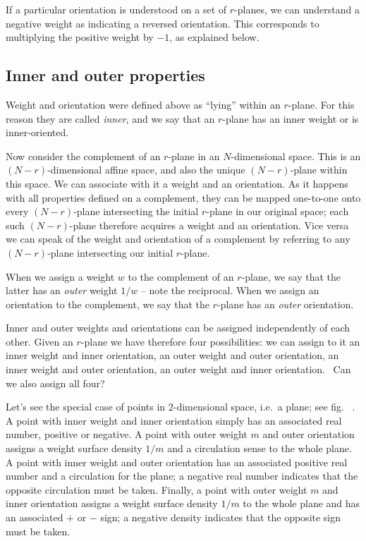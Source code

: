 \documentclass[\ifafour a4paper,12pt,\else a5paper,10pt,\fi%
onecolumn,oneside,article,%
british%
]{memoir}
\theoremstyle{remark}
\theoremstyle{innote}
\renewcommand*{\|}{\nonscript\,\vert\nonscript\;\mathopen{}}
\newcommand*{\fig}{fig.}%
\newcommand*{\ie}{{i.e.}}
\newcommand*{\puzzle}{{\fontencoding{U}\fontfamily{fontawesometwo}\selectfont\symbol{225}}}
\newcommand{\mynote}[1]{ {\color{notecolour}\puzzle\ #1}}
\newcommand*{\+}{\boxplus}
\newcommand*{\yr}{r}
\newcommand*{\yN}{N}
\newcommand*{\yw}{w}
\newcommand*{\ym}{m}
\begin{document}
If a particular orientation is understood on a set of $\yr$-planes, we can
understand a negative weight as indicating a reversed orientation. This
corresponds to multiplying the positive weight by $-1$, as explained below.


\subsection{Inner and outer properties}
\label{sec:inner_outer_properties}

Weight and orientation were defined above as \enquote{lying} within an
$\yr$-plane. For this reason they are called \emph{inner}, and we say that
an $\yr$-plane has an inner weight or is inner-oriented.

Now consider the complement of an $\yr$-plane in an $\yN$-dimensional
space. This is an $(\yN-\yr)$-dimensional affine space, and also the unique
$(\yN-\yr)$-plane within this space. We can associate with it a weight and an
orientation. As it happens with all properties defined on a complement, they
can be mapped one-to-one onto every $(\yN-\yr)$-plane intersecting the
initial $\yr$-plane in our original space; each such $(\yN-\yr)$-plane
therefore acquires a weight and an orientation. Vice versa we can
speak of the weight and orientation of a complement by referring to any
$(\yN-\yr)$-plane intersecting our initial $\yr$-plane.

When we assign a weight $\yw$ to the complement of an $\yr$-plane, we say
that the latter has an \emph{outer} weight $1/\yw$ -- note the reciprocal.
When we assign an orientation to the complement, we say that the
$\yr$-plane has an \emph{outer} orientation.

Inner and outer weights and orientations can be assigned independently of
each other. Given an $\yr$-plane we have therefore four possibilities: we
can assign to it an inner weight and inner orientation, an outer weight and
outer orientation, an inner weight and outer orientation, an outer weight
and inner orientation. \mynote{Can we also assign all four?}

Let's see the special case of points in 2-dimensional space, \ie\ a plane;
see \fig\mynote{}. A point with inner weight and inner orientation simply
has an associated real number, positive or negative. A point with outer
weight $\ym$ and outer orientation assigns a weight surface density $1/\ym$
and a circulation sense to the whole plane. A point with inner weight and
outer orientation has an associated positive real number and a circulation
for the plane; a negative real number indicates that the opposite
circulation must be taken. Finally, a point with outer weight $\ym$ and
inner orientation assigns a weight surface density $1/\ym$ to the whole
plane and has an associated $+$ or $-$ sign; a negative density indicates
that the opposite sign must be taken.
\end{document}
